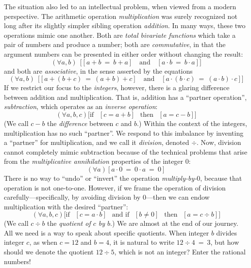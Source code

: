   
The situation also led to an intellectual problem, when viewed from a modern perspective.  The arithmetic operation {\it multiplication} was surely recognized not long after its slightly simpler sibling operation {\it addition}.  In many ways, these two operations mimic one another.  Both are {\em total bivariate functions} which take a pair of numbers and produce a number; both are {\em commutative}, in that the argument numbers can be presented in either order without changing the result:
\[ (\forall a,b) \ \ \big[ [a+b \ = \ b+a]
 \ \ \ \mbox{ and } \ \ \
[a \cdot b \ = \ b \cdot a] \big]
\]
and both are {\em associative}, in the sense asserted by the equations
\[
(\forall a,b) \ \ \big[ [a+(b+c) \ = \ (a+b)+c]
 \ \ \ \mbox{ and } \ \ \ 
[a \cdot (b \cdot c) \ = \ (a \cdot b) \cdot c] \big]
\]
If we restrict our focus to the {\em integers}, however, there is a glaring difference between addition and multiplication.  That is, addition has a ``partner operation'', {\it subtraction}, which operates as an {\it inverse operation}:
\[ (\forall a, b, c) \big[ \mbox{if } \ \ [c = a + b] \ \ \mbox{ then }  \ \ [a = c-b] \big]
\]
(We call $c-b$ the {\em difference} between $c$ and $b$.)  Within the context of the integers, multiplication has no such ``partner''.  We respond to this imbalance by inventing a ``partner'' for
multiplication, and we call it {\it division}, denoted $\div$.  Now, division cannot completely mimic subtraction because of the technical problems that arise from the {\em multiplicative annihilation} properties of the integer $0$:
\[ (\forall a) \left[ a \cdot 0 \ = \ 0 \cdot a \ = \ 0 \right] \] 
There is no way to ``undo'' or ``invert'' the operation {\em multiply-by-$0$}, because that operation is not one-to-one.  However, if we frame the operation of division carefully---specifically, by avoiding division by $0$---then we can endow multiplication with the desired ``partner'':
\[ (\forall a, b, c) \big[ \mbox{if } \ \ [c = a \cdot b] \ \
\mbox{ and if } \ \ [b \neq 0] \ \
 \mbox{ then }  \ \ [a = c \div b] \big]
\]
(We call $c \div b$ the {\em quotient of $c$ by $b$}.)  We are almost at the end of our journey.  All we need is a way to speak about specific quotients.  When integer $b$ divides integer $c$, as when $c = 12$ and $b = 4$, it is natural to write $12 \div 4 \ = \ 3$, but how should we denote the quotient $12 \div 5$, which is not an integer?  Enter the rational numbers!
\index{quotient}

